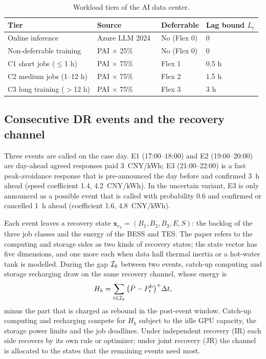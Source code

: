 \begin{table}[!t]
\caption{Workload tiers of the AI data center.}
\label{tab:tiers}
\centering\footnotesize
\begin{tabular}{@{}llll@{}}
\toprule
Tier & Source & Deferrable & Lag bound $L_c$\\
\midrule
Online inference & Azure LLM 2024~\cite{stojkovic2025} & No (Flex 0) & 0\\
Non-deferrable training & PAI $\times$ 25\%~\cite{weng2022} & No (Flex 0) & 0\\
C1 short jobs ($\le$1 h) & PAI $\times$ 75\% & Flex 1 & 0.5 h\\
C2 medium jobs (1--12 h) & PAI $\times$ 75\% & Flex 2 & 1.5 h\\
C3 long training ($>$12 h) & PAI $\times$ 75\% & Flex 3 & 3 h\\
\bottomrule
\end{tabular}
\end{table}

\subsection{Consecutive DR events and the recovery channel}
\label{sec:channel}

Three events are called on the case day. E1 (17:00--18:00) and E2 (19:00--20:00) are day-ahead agreed responses paid
3~CNY/kWh; E3 (21:00--22:00) is a fast peak-avoidance response that is pre-announced the day before and confirmed 3~h
ahead (speed coefficient 1.4, 4.2~CNY/kWh). In the uncertain variant, E3 is only announced as a possible event that is
called with probability 0.6 and confirmed or cancelled 1~h ahead (coefficient 1.6, 4.8~CNY/kWh).

Each event leaves a recovery state $\mathbf{x}_{e_k}=(B_1,B_2,B_3,E,S)$: the backlog of the three job classes and the
energy of the BESS and TES. The paper refers to the computing and storage sides as two kinds of recovery states; the
state vector has five dimensions, and one more each when data hall thermal inertia or a hot-water tank is modelled.
During the gap $\mathcal{I}_k$ between two events, catch-up computing and storage recharging draw on the same recovery
channel, whose energy is
\begin{equation}
H_k=\sum_{t\in\mathcal{I}_k}\big(\bar P-P^{\mathrm{b}}_t\big)^+\Delta t ,
\label{eq:channel}
\end{equation}
minus the part that is charged as rebound in the post-event window. Catch-up computing and recharging compete for $H_k$
subject to the idle GPU capacity, the storage power limits and the job deadlines. Under independent recovery (IR) each
side recovers by its own rule or optimizer; under joint recovery (JR) the channel is allocated to the states that the
remaining events need most.

